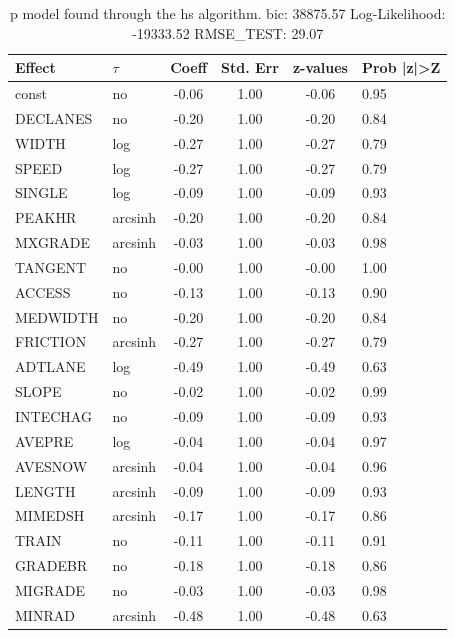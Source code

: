 \begin{table}
	\caption{p model found through the hs algorithm. bic: 38875.57 Log-Likelihood: -19333.52 RMSE_TEST: 29.07}
	\begin{center}
		\begin{tabular}{|l|l|c|c|c|l|}
			\hline
			Effect & $\tau$ & Coeff & Std. Err & z-values & Prob |z|>Z \\
			\hline
			const & no & -0.06 & 1.00 & -0.06 & 0.95 \\
			\hline
			DECLANES & no & -0.20 & 1.00 & -0.20 & 0.84 \\
			\hline
			WIDTH & log & -0.27 & 1.00 & -0.27 & 0.79 \\
			\hline
			SPEED & log & -0.27 & 1.00 & -0.27 & 0.79 \\
			\hline
			SINGLE & log & -0.09 & 1.00 & -0.09 & 0.93 \\
			\hline
			PEAKHR & arcsinh & -0.20 & 1.00 & -0.20 & 0.84 \\
			\hline
			MXGRADE & arcsinh & -0.03 & 1.00 & -0.03 & 0.98 \\
			\hline
			TANGENT & no & -0.00 & 1.00 & -0.00 & 1.00 \\
			\hline
			ACCESS & no & -0.13 & 1.00 & -0.13 & 0.90 \\
			\hline
			MEDWIDTH & no & -0.20 & 1.00 & -0.20 & 0.84 \\
			\hline
			FRICTION & arcsinh & -0.27 & 1.00 & -0.27 & 0.79 \\
			\hline
			ADTLANE & log & -0.49 & 1.00 & -0.49 & 0.63 \\
			\hline
			SLOPE & no & -0.02 & 1.00 & -0.02 & 0.99 \\
			\hline
			INTECHAG & no & -0.09 & 1.00 & -0.09 & 0.93 \\
			\hline
			AVEPRE & log & -0.04 & 1.00 & -0.04 & 0.97 \\
			\hline
			AVESNOW & arcsinh & -0.04 & 1.00 & -0.04 & 0.96 \\
			\hline
			LENGTH & arcsinh & -0.09 & 1.00 & -0.09 & 0.93 \\
			\hline
			MIMEDSH & arcsinh & -0.17 & 1.00 & -0.17 & 0.86 \\
			\hline
			TRAIN & no & -0.11 & 1.00 & -0.11 & 0.91 \\
			\hline
			GRADEBR & no & -0.18 & 1.00 & -0.18 & 0.86 \\
			\hline
			MIGRADE & no & -0.03 & 1.00 & -0.03 & 0.98 \\
			\hline
			MINRAD & arcsinh & -0.48 & 1.00 & -0.48 & 0.63 \\

\end{tabular}
\end{center}
\end{table}
